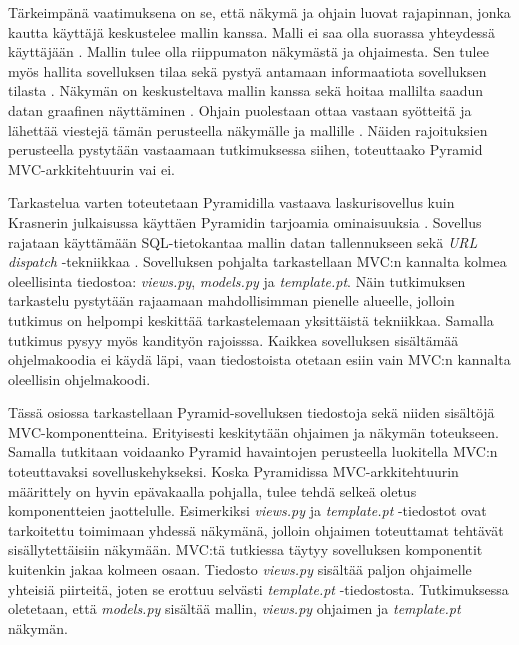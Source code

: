 \documentclass[finnish,utf8,nonumbib,palatino,kandi]{gradu2}
\begin{document}
Tärkeimpänä vaatimuksena on se, että näkymä ja ohjain luovat rajapinnan, jonka kautta käyttäjä keskustelee mallin kanssa. Malli ei saa olla suorassa yhteydessä käyttäjään \cite[s. 10]{Reenskaug:tools}.
Mallin tulee olla riippumaton näkymästä ja ohjaimesta. Sen tulee myös hallita sovelluksen tilaa sekä pystyä antamaan informaatiota sovelluksen tilasta \cite{Burbeck}. Näkymän on keskusteltava mallin kanssa sekä hoitaa mallilta saadun datan graafinen näyttäminen \cite[s.1]{Reenskaug:orig}. Ohjain puolestaan ottaa vastaan syötteitä ja lähettää viestejä tämän perusteella näkymälle ja mallille \cite{Burbeck}. Näiden rajoituksien perusteella pystytään vastaamaan tutkimuksessa siihen, toteuttaako Pyramid MVC-arkkitehtuurin vai ei.

Tarkastelua varten toteutetaan Pyramidilla vastaava laskurisovellus kuin Krasnerin julkaisussa käyttäen Pyramidin tarjoamia ominaisuuksia \cite{Krasner:desc}. Sovellus rajataan käyttämään SQL-tietokantaa mallin datan tallennukseen sekä \emph{URL dispatch} -tekniikkaa \cite{urldispatch, sql}. Sovelluksen pohjalta tarkastellaan MVC:n kannalta kolmea oleellisinta tiedostoa: \emph{views.py}, \emph{models.py} ja \emph{template.pt}. Näin tutkimuksen tarkastelu pystytään rajaamaan mahdollisimman pienelle alueelle, jolloin tutkimus on helpompi keskittää tarkastelemaan yksittäistä tekniikkaa. Samalla tutkimus pysyy myös kandityön rajoisssa. Kaikkea sovelluksen sisältämää ohjelmakoodia ei käydä läpi, vaan tiedostoista otetaan esiin vain MVC:n kannalta oleellisin ohjelmakoodi.

Tässä osiossa tarkastellaan Pyramid-sovelluksen tiedostoja sekä niiden sisältöjä MVC-komponentteina. Erityisesti keskitytään ohjaimen ja näkymän toteukseen. Samalla tutkitaan voidaanko Pyramid havaintojen perusteella luokitella MVC:n toteuttavaksi sovelluskehykseksi.
Koska Pyramidissa MVC-arkkitehtuurin määrittely on hyvin epävakaalla pohjalla, tulee tehdä selkeä oletus komponentteien jaottelulle. Esimerkiksi \emph{views.py} ja \emph{template.pt} -tiedostot ovat tarkoitettu toimimaan yhdessä näkymänä, jolloin ohjaimen toteuttamat tehtävät sisällytettäisiin näkymään. MVC:tä tutkiessa täytyy sovelluksen komponentit kuitenkin jakaa kolmeen osaan.  Tiedosto \emph{views.py}
sisältää paljon ohjaimelle yhteisiä piirteitä, joten se erottuu selvästi \emph{template.pt} -tiedostosta. Tutkimuksessa oletetaan, että \emph{models.py} sisältää mallin, \emph{views.py} ohjaimen ja \emph{template.pt} näkymän.
\end{document}
